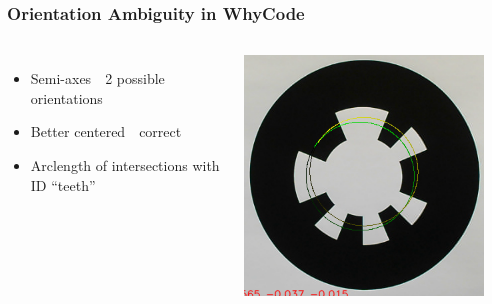 \documentclass[aspectratio=169]{rubeamer}
\newif\ifpause
\newcommand{\mypause}{\ifpause \pause \fi}
\begin{document}
\begin{frame}
  \frametitle{Orientation Ambiguity in WhyCode}
  \begin{columns}
    \begin{itemize}
      \item Semi-axes~\textrightarrow~2 possible orientations
      \mypause
      \item Better centered~\textrightarrow~correct
      \mypause
      \item Arclength of intersections with ID ``teeth''
    \end{itemize}
    \centering
    \onslide
    \includegraphics[width=0.9\textwidth]{whycode_orig_both_solutions_cropped}
  \end{columns}
\end{frame}
\end{document}
